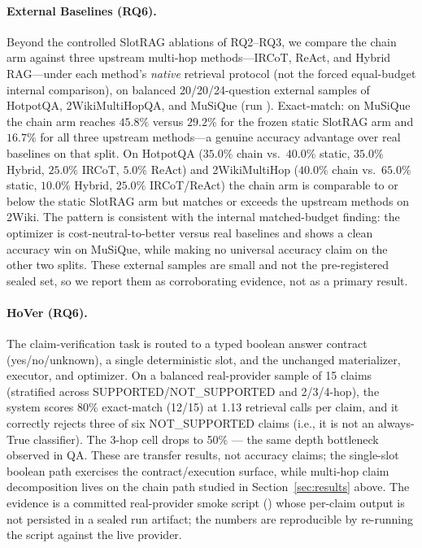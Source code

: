 \paragraph{External Baselines (RQ6).} Beyond the controlled SlotRAG
ablations of RQ2--RQ3, we compare the chain arm against three upstream
multi-hop methods---IRCoT, ReAct, and Hybrid RAG---under each method's
\emph{native} retrieval protocol (not the forced equal-budget internal
comparison), on balanced 20/20/24-question external samples of HotpotQA,
2WikiMultiHopQA, and MuSiQue (run ). Exact-match:
on MuSiQue the chain arm reaches $45.8\%$ versus $29.2\%$ for the frozen
static SlotRAG arm and $16.7\%$ for all three upstream methods---a genuine
accuracy advantage over real baselines on that split. On HotpotQA
($35.0\%$ chain vs.\ $40.0\%$ static, $35.0\%$ Hybrid, $25.0\%$ IRCoT,
$5.0\%$ ReAct) and 2WikiMultiHop ($40.0\%$ chain vs.\ $65.0\%$ static,
$10.0\%$ Hybrid, $25.0\%$ IRCoT/ReAct) the chain arm is comparable to or
below the static SlotRAG arm but matches or exceeds the upstream methods on
2Wiki. The pattern is consistent with the internal matched-budget finding:
the optimizer is cost-neutral-to-better versus real baselines and shows a
clean accuracy win on MuSiQue, while making no universal accuracy claim on
the other two splits. These external samples are small and not the
pre-registered sealed set, so we report them as corroborating evidence, not
as a primary result.

\paragraph{HoVer (RQ6).} The claim-verification task is routed to a typed
boolean answer contract (yes/no/unknown), a single deterministic
 slot, and the unchanged materializer,
executor, and optimizer. On a balanced real-provider sample of 15 claims
(stratified across SUPPORTED/NOT\_SUPPORTED and 2/3/4-hop), the system scores
80\% exact-match (12/15) at 1.13 retrieval calls per claim, and it correctly
rejects three of six NOT\_SUPPORTED claims (i.e., it is not an always-True
classifier). The 3-hop cell drops to 50\% --- the same depth bottleneck
observed in QA. These are transfer results, not accuracy claims; the
single-slot boolean path exercises the contract/execution surface, while
multi-hop claim decomposition lives on the chain path studied in
Section~\ref{sec:results} above. The evidence is a committed real-provider
smoke script () whose per-claim output is
not persisted in a sealed run artifact; the numbers are reproducible by
re-running the script against the live provider.


